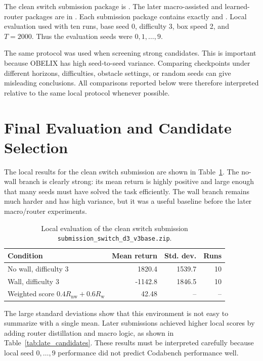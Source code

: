 \documentclass[11pt, oneside]{article}   	%
\begin{document}
The clean switch submission package is
. The later
macro-assisted and learned-router packages are in . Each
submission package contains exactly  and . Local
evaluation used  with ten runs, base seed 0, difficulty 3, box speed
2, and \(T=2000\). Thus the evaluation seeds were \(0,1,\ldots,9\).

The same protocol was used when screening strong candidates. This is important because
OBELIX has high seed-to-seed variance. Comparing checkpoints under different horizons,
difficulties, obstacle settings, or random seeds can give misleading conclusions. All
comparisons reported below were therefore interpreted relative to the same local
protocol whenever possible.

\section{Final Evaluation and Candidate Selection}

The local results for the clean switch submission are shown in
Table~\ref{tab:final_eval}. The no-wall branch is clearly strong: its mean return is
highly positive and large enough that many seeds must have solved the task efficiently.
The wall branch remains much harder and has high variance, but it was a useful baseline
before the later macro/router experiments.

\begin{table}[htbp]
\centering
\begin{tabular}{lrrr}
\toprule
Condition & Mean return & Std. dev. & Runs \\
\midrule
No wall, difficulty 3 & 1820.4 & 1539.7 & 10 \\
Wall, difficulty 3 & -1142.8 & 1846.5 & 10 \\
\midrule
Weighted score \(0.4R_{\text{nw}}+0.6R_{\text{w}}\) & 42.48 & -- & -- \\
\bottomrule
\end{tabular}
\caption{Local evaluation of the clean switch submission
\texttt{submission\_switch\_d3\_v3base.zip}.}
\label{tab:final_eval}
\end{table}

The large standard deviations show that this environment is not easy to summarize with a
single mean. Later submissions achieved higher local scores by adding router
distillation and macro logic, as shown in Table~\ref{tab:late_candidates}. These results
must be interpreted carefully because local seed \(0,\ldots,9\) performance did not
predict Codabench performance well.
\end{document}
